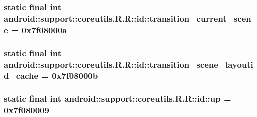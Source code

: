 \hypertarget{classandroid_1_1support_1_1coreutils_1_1_r_1_1id_21a5a0a7b46dc9d5499bb8d8293a7405}{
\subsubsection[{transition\_\-current\_\-scene}]{\setlength{\rightskip}{0pt plus 5cm}static final int android::support::coreutils.R.R::id::transition\_\-current\_\-scene = 0x7f08000a}}
\label{classandroid_1_1support_1_1coreutils_1_1_r_1_1id_21a5a0a7b46dc9d5499bb8d8293a7405}


\hypertarget{classandroid_1_1support_1_1coreutils_1_1_r_1_1id_fc0cb6c86ab9494fee0882083a49a723}{
\subsubsection[{transition\_\-scene\_\-layoutid\_\-cache}]{\setlength{\rightskip}{0pt plus 5cm}static final int android::support::coreutils.R.R::id::transition\_\-scene\_\-layoutid\_\-cache = 0x7f08000b}}
\label{classandroid_1_1support_1_1coreutils_1_1_r_1_1id_fc0cb6c86ab9494fee0882083a49a723}


\hypertarget{classandroid_1_1support_1_1coreutils_1_1_r_1_1id_e0b732cb4780300e832c0991fc7a2801}{
\subsubsection[{up}]{\setlength{\rightskip}{0pt plus 5cm}static final int android::support::coreutils.R.R::id::up = 0x7f080009}}
\label{classandroid_1_1support_1_1coreutils_1_1_r_1_1id_e0b732cb4780300e832c0991fc7a2801}


